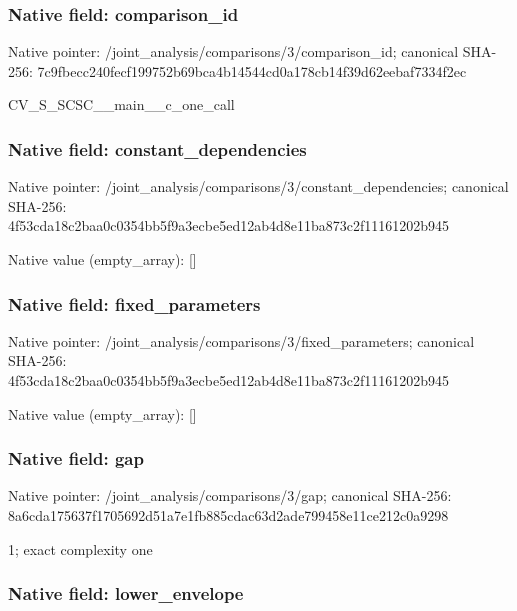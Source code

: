 \documentclass[10pt,a4paper]{article}
\begin{document}
\subsubsection{Native field: comparison\_id}


Native pointer: /joint\_analysis/comparis\allowbreak{}ons/3/comparison\_id; canonical SHA-256: 7c9fbecc240fecf199752b69\allowbreak{}bca4b14544cd0a178cb14f39\allowbreak{}d62eebaf7334f2ec


CV\_S\_SCSC\_\_main\_\_c\_one\_call


\subsubsection{Native field: constant\_dependencies}


Native pointer: /joint\_analysis/comparis\allowbreak{}ons/3/constant\_dependenc\allowbreak{}ies; canonical SHA-256: 4f53cda18c2baa0c0354bb5f\allowbreak{}9a3ecbe5ed12ab4d8e11ba87\allowbreak{}3c2f11161202b945



Native value (empty\_array): []



\subsubsection{Native field: fixed\_parameters}


Native pointer: /joint\_analysis/comparis\allowbreak{}ons/3/fixed\_parameters; canonical SHA-256: 4f53cda18c2baa0c0354bb5f\allowbreak{}9a3ecbe5ed12ab4d8e11ba87\allowbreak{}3c2f11161202b945



Native value (empty\_array): []



\subsubsection{Native field: gap}


Native pointer: /joint\_analysis/comparisons/3/gap; canonical SHA-256: 8a6cda175637f1705692d51a\allowbreak{}7e1fb885cdac63d2ade79945\allowbreak{}8e11ce212c0a9298


1; exact complexity one


\subsubsection{Native field: lower\_envelope}
\end{document}
